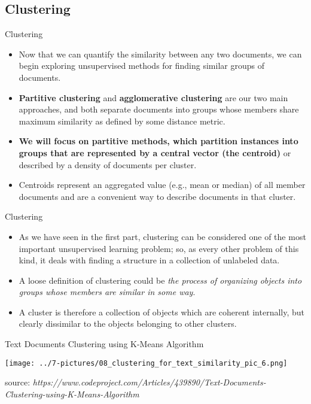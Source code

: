 \documentclass[11pt]{beamer}
\begin{document}
\subsection{Clustering \\ \scalebox{0.8}{}}
\begin{frame}{Clustering}
	\begin{itemize}
		\item Now that we can quantify the similarity between any two documents, we can begin exploring unsupervised methods for finding similar groups of documents. 
		\item \textbf{Partitive clustering} and \textbf{agglomerative clustering} are our two main approaches, and both separate documents into groups whose members share maximum similarity as defined by some distance metric.
		\item \textbf{We will focus on partitive methods, which partition instances into groups that are represented by a central vector (the centroid)} or described by a density of documents per cluster. 
		\item Centroids represent an aggregated value (e.g., mean or median) of all member documents and are a convenient way to describe documents in that cluster.
	\end{itemize}
\end{frame}
\begin{frame}{Clustering}
	\begin{itemize}
		\item As we have seen in the first part, clustering can be considered one of the most important unsupervised learning problem; so, as every other problem of this kind, it deals with finding a structure in a collection of unlabeled data. 
		\item A loose definition of clustering could be \textit{the process of organizing objects into groups whose members are similar in some way}. 
		\item A cluster is therefore a collection of objects which are coherent internally, but clearly dissimilar to the objects belonging to other clusters.
	\end{itemize}
\end{frame}
\begin{frame}{Text Documents Clustering using K-Means Algorithm }
	\begin{center}
	\texttt{[image: ../7-pictures/08\_clustering\_for\_text\_similarity\_pic\_6.png]}
	\end{center}
	\footnotesize{source: \textit{https://www.codeproject.com/Articles/439890/Text-Documents-Clustering-using-K-Means-Algorithm}}
\end{frame}
\end{document}
